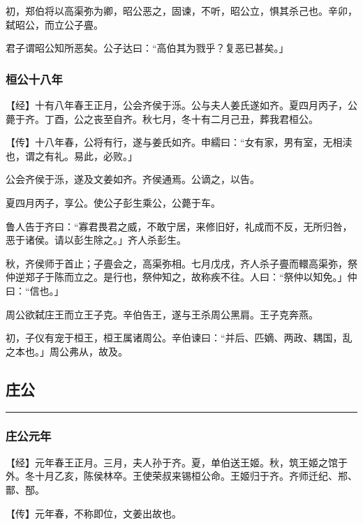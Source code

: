 \documentclass[]{article}
\begin{document}
初，郑伯将以高渠弥为卿，昭公恶之，固谏，不听，昭公立，惧其杀己也。辛卯，弑昭公，而立公子亹。

君子谓昭公知所恶矣。公子达曰：``高伯其为戮乎？复恶已甚矣。」

\hypertarget{header-n340}{%
\subsubsection{桓公十八年}\label{header-n340}}

【经】十有八年春王正月，公会齐侯于泺。公与夫人姜氏遂如齐。夏四月丙子，公薨于齐。丁酉，公之丧至自齐。秋七月，冬十有二月己丑，葬我君桓公。

【传】十八年春，公将有行，遂与姜氏如齐。申繻曰：``女有家，男有室，无相渎也，谓之有礼。易此，必败。」

公会齐侯于泺，遂及文姜如齐。齐侯通焉。公谪之，以告。

夏四月丙子，享公。使公子彭生乘公，公薨于车。

鲁人告于齐曰：``寡君畏君之威，不敢宁居，来修旧好，礼成而不反，无所归咎，恶于诸侯。请以彭生除之。」齐人杀彭生。

秋，齐侯师于首止；子亹会之，高渠弥相。七月戊戌，齐人杀子亹而轘高渠弥，祭仲逆郑子于陈而立之。是行也，祭仲知之，故称疾不往。人曰：``祭仲以知免。」仲曰：``信也。」

周公欲弑庄王而立王子克。辛伯告王，遂与王杀周公黑肩。王子克奔燕。

初，子仪有宠于桓王，桓王属诸周公。辛伯谏曰：``并后、匹嫡、两政、耦国，乱之本也。」周公弗从，故及。

\hypertarget{header-n353}{%
\subsection{庄公}\label{header-n353}}

\begin{center}\rule{0.5\linewidth}{\linethickness}\end{center}

\hypertarget{header-n355}{%
\subsubsection{庄公元年}\label{header-n355}}

【经】元年春王正月。三月，夫人孙于齐。夏，单伯送王姬。秋，筑王姬之馆于外。冬十月乙亥，陈侯林卒。王使荣叔来锡桓公命。王姬归于齐。齐师迁纪、郱、鄑、郚。

【传】元年春，不称即位，文姜出故也。
\end{document}
